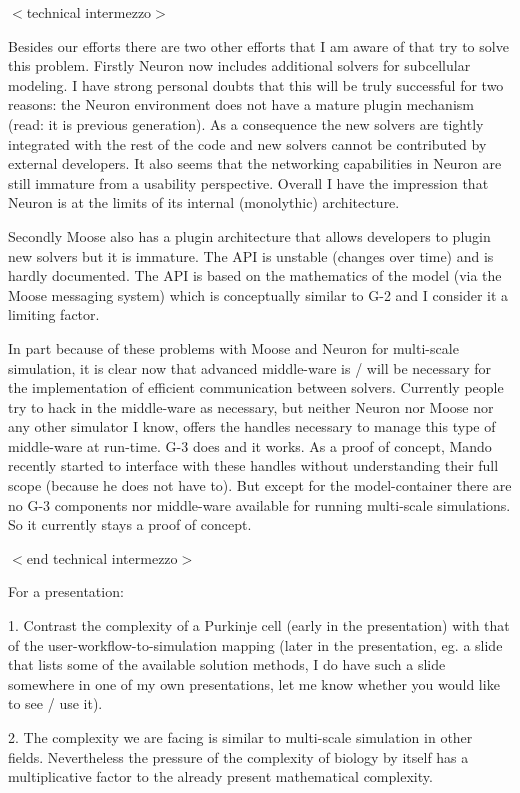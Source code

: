 \documentclass[12pt]{article}
\begin{document}
$<$technical intermezzo$>$

Besides our efforts there are two other efforts that I am aware of
that try to solve this problem.  Firstly Neuron now includes
additional solvers for subcellular modeling.  I have strong personal
doubts that this will be truly successful for two reasons: the Neuron
environment does not have a mature plugin mechanism (read: it is
previous generation).  As a consequence the new solvers are tightly
integrated with the rest of the code and new solvers cannot be
contributed by external developers.  It also seems that the networking
capabilities in Neuron are still immature from a usability
perspective.  Overall I have the impression that Neuron is at the
limits of its internal (monolythic) architecture.

Secondly Moose also has a plugin architecture that allows developers
to plugin new solvers but it is immature.  The API is unstable
(changes over time) and is hardly documented.  The API is based on the
mathematics of the model (via the Moose messaging system) which is
conceptually similar to G-2 and I consider it a limiting factor.

In part because of these problems with Moose and Neuron for
multi-scale simulation, it is clear now that advanced middle-ware is /
will be necessary for the implementation of efficient communication
between solvers.  Currently people try to hack in the middle-ware as
necessary, but neither Neuron nor Moose nor any other simulator I
know, offers the handles necessary to manage this type of middle-ware
at run-time.  G-3 does and it works.  As a proof of concept, Mando
recently started to interface with these handles without understanding
their full scope (because he does not have to).  But except for the
model-container there are no G-3 components nor middle-ware available
for running multi-scale simulations.  So it currently stays a proof of
concept.

$<$end technical intermezzo$>$

For a presentation:

1. Contrast the complexity of a Purkinje cell (early in the
presentation) with that of the user-workflow-to-simulation mapping
(later in the presentation, eg. a slide that lists some of the
available solution methods, I do have such a slide somewhere in one of
my own presentations, let me know whether you would like to see / use
it).

2. The complexity we are facing is similar to multi-scale simulation
in other fields.  Nevertheless the pressure of the complexity of
biology by itself has a multiplicative factor to the already present
mathematical complexity.
\end{document}
